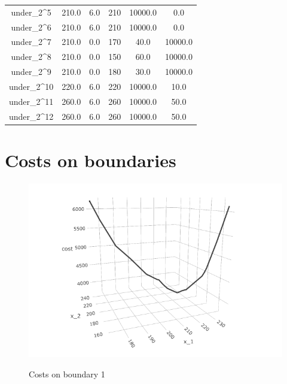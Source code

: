 \documentclass[a4paper,11pt]{article}
\begin{document}
\begin{longtable}{cccccc}
under\_2\textasciicircum{}5 & 210.0 & 6.0 & 210 & 10000.0 & 0.0\\
under\_2\textasciicircum{}6 & 210.0 & 6.0 & 210 & 10000.0 & 0.0\\
\addlinespace
under\_2\textasciicircum{}7 & 210.0 & 0.0 & 170 & 40.0 & 10000.0\\
under\_2\textasciicircum{}8 & 210.0 & 0.0 & 150 & 60.0 & 10000.0\\
under\_2\textasciicircum{}9 & 210.0 & 0.0 & 180 & 30.0 & 10000.0\\
under\_2\textasciicircum{}10 & 220.0 & 6.0 & 220 & 10000.0 & 10.0\\
under\_2\textasciicircum{}11 & 260.0 & 6.0 & 260 & 10000.0 & 50.0\\
\addlinespace
under\_2\textasciicircum{}12 & 260.0 & 6.0 & 260 & 10000.0 & 50.0\\*
\end{longtable}
\endgroup{}

\section{Costs on boundaries}
\label{se:costfun}

\begin{figure}[ht]
\centering
\caption{Costs on boundary 1}
\includegraphics[width=\textwidth]{Example-figure_files/figure-latex/boundary1.png}
\label{fig:bd1}
\end{figure}
\end{document}
